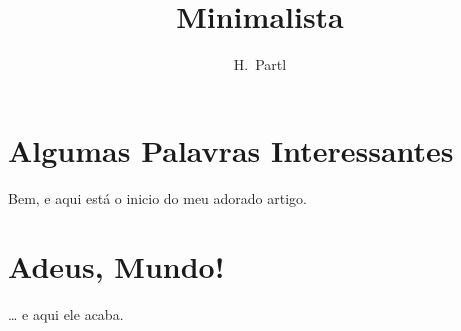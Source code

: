 \documentclass[a4paper,11pt]{article}
\author{H.~Partl}
\title{Minimalista}
\begin{document}
\maketitle
\tableofcontents
\section{Algumas Palavras Interessantes}
Bem, e aqui está o inicio do meu adorado artigo.
\section{Adeus, Mundo!}
\ldots{} e aqui ele acaba.
\end{document}
